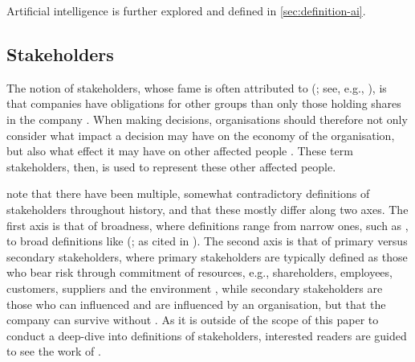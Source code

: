 Artificial intelligence is further explored and defined in \autoref{sec:definition-ai}.


\subsection{Stakeholders}
The notion of stakeholders, whose fame is often attributed to  \citeauthor{Freeman_1984_stakeholders,Freeman_1983_stakeholders} (\citeyear{Freeman_1983_stakeholders,Freeman_1984_stakeholders}; see, e.g., \cite{Mitchell_1997_stakeholders}), is that companies have obligations for other groups than only those holding shares in the company \parencite{Freeman_1983_stakeholders}. When making decisions, organisations should therefore not only consider what impact a decision may have on the economy of the organisation, but also what effect it may have on other affected people \parencite{Freeman_1983_stakeholders}. These term stakeholders, then, is used to represent these other affected people.

\textcite{Mitchell_1997_stakeholders} note that there have been multiple, somewhat contradictory definitions of stakeholders throughout history, and that these mostly differ along two axes. The first axis is that of broadness, where definitions range from narrow ones, such as  \parencite{Freeman_1983_stakeholders}, to broad definitions like  (\cite{Freeman_1984_stakeholders}; as cited in \cite[p.~856]{Mitchell_1997_stakeholders}). The second axis is that of primary versus secondary stakeholders, where primary stakeholders are typically defined as those who bear risk through commitment of resources, e.g., shareholders, employees, customers, suppliers and the environment \parencite{Hillman_2001_stakeholders}, while secondary stakeholders are those who can influenced and are influenced by an organisation, but that the company can survive without \parencite{Benn_2016_stakeholders}. As it is outside of the scope of this paper to conduct a deep-dive into definitions of stakeholders, interested readers are guided to see the work of \textcite{Mitchell_1997_stakeholders}.

